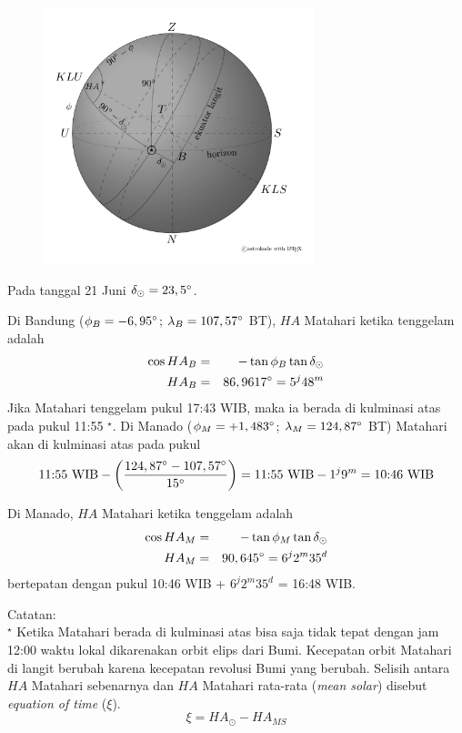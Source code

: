\documentclass[11pt,fleqn, a4paper]{exam}
\begin{document}
\begin{questions}
\begin{figure}[H]
\centering
\includegraphics[width=0.7\textwidth]{gambar/sunset.pdf}
\end{figure}

Pada tanggal 21 Juni $\delta_{\odot} = 23,5\degree$.

Di Bandung ($\phi_B = -6,95\degree$; $\lambda_B = 107,57\degree$ BT), $HA$ Matahari ketika tenggelam adalah 
\begin{eqnarray*}
\cos HA_{B} &=& - \tan \phi_{B} \tan \delta_{\odot} \\
HA_B &=& 86,9617\degree = 5^j 48^m
\end{eqnarray*}
Jika Matahari tenggelam pukul 17:43 WIB, maka ia berada di kulminasi atas pada pukul 11:55 $^\star$. Di Manado ($\phi_M = +1,483\degree$; $\lambda_M = 124,87\degree$ BT) Matahari akan di kulminasi atas pada pukul 
\begin{eqnarray*}
\text{11:55 WIB} - \left( \frac{124,87\degree - 107,57\degree}{15\degree} \right) = \text{11:55 WIB} - 1^j 9^m = \text{10:46 WIB}
\end{eqnarray*}

Di Manado, $HA$ Matahari ketika tenggelam adalah
\begin{eqnarray*}
\cos HA_{M} &=& - \tan \phi_{M} \tan \delta_{\odot} \\
HA_M &=& 90,645\degree = 6^j 2^m 35^d
\end{eqnarray*}
bertepatan dengan pukul 10:46 WIB + $6^j 2^m 35^d$ = 16:48 WIB.

Catatan:\\
$^\star$ Ketika Matahari berada di kulminasi atas bisa saja tidak tepat dengan jam 12:00 waktu lokal dikarenakan orbit elips dari Bumi. Kecepatan orbit Matahari di langit berubah karena kecepatan revolusi Bumi yang berubah. Selisih antara $HA$ Matahari sebenarnya dan $HA$ Matahari rata-rata (\textit{mean solar}) disebut \textit{equation of time} ($\xi$).
\begin{equation*}
\xi = HA_{\odot} - HA_{MS}
\end{equation*}



\end{questions}
\end{document}
